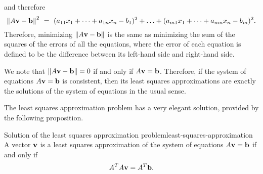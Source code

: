 and therefore
\begin{equation*}
  \norm{A\vect{v} - \vect{b}}^2 ~=~
  (a_{11}x_1 + \cdots + a_{1n}x_n - b_1)^2 + \ldots
  + (a_{m1}x_1 + \cdots + a_{mn}x_n - b_m)^2.
\end{equation*}
Therefore, minimizing $\norm{A\vect{v}-\vect{b}}$ is the same as
minimizing the sum of the squares of the errors of all the equations,
where the error of each equation is defined to be the difference
between its left-hand side and right-hand side.

We note that $\norm{A\vect{v}-\vect{b}}=0$ if and only if
$A\vect{v}=\vect{b}$. Therefore, if the system of equations
$A\vect{v}=\vect{b}$ is consistent, then its least squares
approximations are exactly the solutions of the system of equations in
the usual sense.

The least squares approximation problem has a very elegant solution,
provided by the following proposition.

\begin{proposition}{Solution of the least squares approximation problem}{least-squares-approximation}
  A vector $\vect{v}$ is a least squares approximation of the system
  of equations $A\vect{v}=\vect{b}$ if and only if
  \begin{equation*}
    A^TA\vect{v} = A^T\vect{b}.
  \end{equation*}
\end{proposition}

